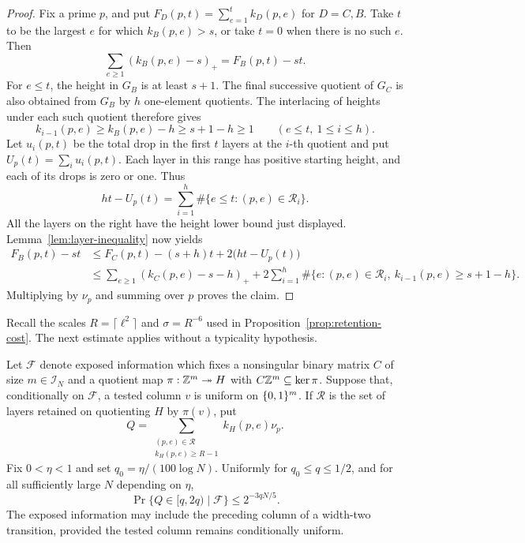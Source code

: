 \begin{proof}
Fix a prime \(p\), and put
\(F_D(p,t)=\sum_{e=1}^{t}k_D(p,e)\) for \(D=C,B\).
Take \(t\) to be the largest \(e\) for which \(k_B(p,e)>s\), or take
\(t=0\) when there is no such \(e\). Then
\[
 \sum_{e\ge1}(k_B(p,e)-s)_+=F_B(p,t)-st.
\]
For \(e\le t\), the height in \(G_B\) is at least \(s+1\).
The final successive quotient of \(G_C\) is also obtained from \(G_B\)
by \(h\) one-element quotients. The interlacing of heights under each
such quotient therefore gives
\[
 k_{i-1}(p,e)\ge k_B(p,e)-h\ge s+1-h\ge1
 \qquad (e\le t,\ 1\le i\le h).
\]
Let \(u_i(p,t)\) be the total drop in the first \(t\) layers at the
\(i\)-th quotient and put \(U_p(t)=\sum_i u_i(p,t)\). Each layer in
this range has positive starting height, and each of its drops is zero
or one. Thus
\[
 ht-U_p(t)=\sum_{i=1}^{h}
       \#\{e\le t:(p,e)\in\mathcal R_i\}.
\]
All the layers on the right have the height lower bound just displayed.
Lemma~\ref{lem:layer-inequality} now yields
\[
 \begin{split}
 F_B(p,t)-st
 &\le F_C(p,t)-(s+h)t+2\bigl(ht-U_p(t)\bigr)\\
 &\le \sum_{e\ge1}(k_C(p,e)-s-h)_+
       +2\sum_{i=1}^{h}
          \#\{e:(p,e)\in\mathcal R_i,\ k_{i-1}(p,e)\ge s+1-h\}.
 \end{split}
\]
Multiplying by \(\nu_p\) and summing over \(p\) proves the claim.
\end{proof}

Recall the scales \(R=\lceil\ell^2\rceil\) and \(\sigma=R^{-6}\) used
in Proposition~\ref{prop:retention-cost}. The next estimate applies
without a typicality hypothesis.

\begin{lemma}\label{lem:heavy-retention-cost}
Let \(\mathcal F\) denote exposed information which fixes a nonsingular
binary matrix \(C\) of size \(m\in\mathcal I_N\) and a quotient map
\(\pi:\mathbb Z^m\twoheadrightarrow H\) with \(C\mathbb Z^m\subseteq\ker\pi\).
Suppose that, conditionally on \(\mathcal F\), a tested column \(v\) is
uniform on \(\{0,1\}^m\). If \(\mathcal R\) is the set of layers
retained on quotienting \(H\) by \(\pi(v)\), put
\[
 Q=\sum_{\substack{(p,e)\in\mathcal R\\ k_H(p,e)\ge R-1}}
           k_H(p,e)\nu_p.
\]
Fix \(0<\eta<1\) and set \(q_0=\eta/(100\log N)\). Uniformly for
\(q_0\le q\le1/2\), and for all sufficiently large \(N\) depending
on \(\eta\),
\begin{equation}\label{eq:path-heavy-retention}
 \Pr\{Q\in[q,2q)\mid\mathcal F\}\le 2^{-3qN/5}.
\end{equation}
The exposed information may include the preceding column of a width-two
transition, provided the tested column remains conditionally uniform.
\end{lemma}

